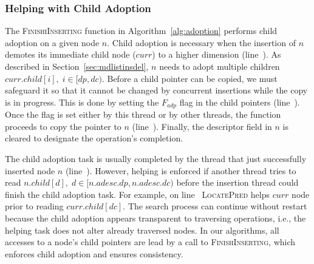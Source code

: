 \documentclass[10pt,journal,letter,compsoc]{IEEEtran}
\begin{document}

\subsubsection{Helping with Child Adoption}
The \textsc{FinishiInserting} function in Algorithm~\ref{alg:adoption} performs child adoption on a given node $n$.
Child adoption is necessary when the insertion of $n$ demotes its immediate child node ($curr$) to a higher dimension (line~).
As described in Section~\ref{sec:mdlistinsdel}, $n$ needs to adopt multiple children $curr.child[i],\;i\in [dp,dc)$.
Before a child pointer can be copied, we must safeguard it so that it cannot be changed by concurrent insertions while the copy is in progress.
This is done by setting the $F_{adp}$ flag in the child pointers (line~).
Once the flag is set either by this thread or by other threads, the function proceeds to copy the pointer to $n$ (line~). 
Finally, the descriptor field in $n$ is cleared to designate the operation's completion.

The child adoption task is usually completed by the thread that just successfully inserted node $n$ (line~).
However, helping is enforced if another thread tries to read $n.child[d],\;d \in[n.adesc.dp,n.adesc.dc)$ before the insertion thread could finish the child adoption task.
For example, on line~ \textsc{LocatePred} helps $curr$ node prior to reading $curr.child[dc]$.
The search process can continue without restart because the child adoption appears transparent to traversing operations, i.e., the helping task does not alter already traversed nodes.
In our algorithms, all accesses to a node's child pointers are lead by a call to \textsc{FinishInserting}, which enforces child adoption and ensures consistency.
\end{document}
